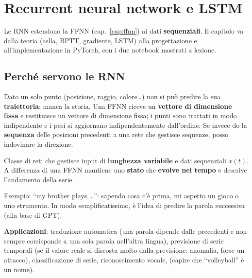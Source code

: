 \chapter{Recurrent neural network e LSTM}
\label{cap:rnn}

Le RNN estendono la FFNN (cap.~\ref{cap:ffnn}) ai dati \textbf{sequenziali}. Il capitolo va dalla teoria (cella, BPTT,
gradiente, LSTM) alla progettazione e all'implementazione in PyTorch, con i due notebook mostrati a lezione.

\section{Perché servono le RNN}
Dato un solo punto (posizione, raggio, colore\ldots) non si può predire la sua \textbf{traiettoria}: manca la storia.
Una FFNN riceve un \textbf{vettore di dimensione fissa} e restituisce un vettore di dimensione fissa; i punti sono trattati
in modo indipendente e i pesi si aggiornano indipendentemente dall'ordine. Se invece do la \textbf{sequenza} delle posizioni
precedenti a una rete che gestisce sequenze, posso indovinare la direzione.

\begin{definizione}
Classe di reti che gestisce input di \textbf{lunghezza variabile} e dati sequenziali $x(t)$. A differenza di una FFNN
mantiene uno \textbf{stato} che \textbf{evolve nel tempo} e descrive l'andamento della serie.
\end{definizione}
Esempio: ``my brother plays \ldots'': sapendo cosa c'è prima, mi aspetto un gioco o uno strumento. In modo
semplificatissimo, è l'idea di predire la parola successiva (alla base di GPT).

\textbf{Applicazioni}: traduzione automatica (una parola dipende dalle precedenti e non sempre corrisponde a una sola parola
nell'altra lingua), previsione di serie temporali (se il valore reale si discosta molto dalla previsione: anomalia, forse un
attacco), classificazione di serie, riconoscimento vocale,  (capire che ``volleyball'' è un nome).

